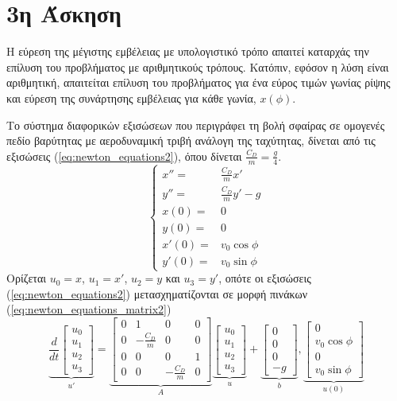 \documentclass[assignment4.tex]{subfiles}
\begin{document}
\section*{3η Άσκηση}
Η εύρεση της μέγιστης εμβέλειας με υπολογιστικό τρόπο απαιτεί καταρχάς την επίλυση του προβλήματος με αριθμητικούς τρόπους. Κατόπιν, εφόσον η λύση είναι αριθμητική, απαιτείται επίλυση του προβλήματος για ένα εύρος τιμών γωνίας ρίψης και εύρεση της συνάρτησης εμβέλειας για κάθε γωνία, $x(\phi)$. 

Το σύστημα διαφορικών εξισώσεων που περιγράφει τη βολή σφαίρας σε ομογενές πεδίο βαρύτητας με αεροδυναμική τριβή ανάλογη της ταχύτητας, δίνεται από τις εξισώσεις (\ref{eq:newton_equations2}), όπου δίνεται $\frac{C_D}{m}=\frac{g}{4}$.
\begin{equation}
\left\{
\begin{matrix}
x'' =& \frac{C_D}{m}x' \\
y'' =& \frac{C_D}{m}y'-g \\
x(0) =& 0 \\
y(0) =& 0 \\
x'(0) =& v_0 \cos \phi \\
y'(0) =& v_0 \sin \phi
\end{matrix}
\right.
\label{eq:newton_equations2}
\end{equation}
Ορίζεται $u_0=x$, $u_1=x'$, $u_2=y$ και $u_3=y'$, οπότε οι εξισώσεις (\ref{eq:newton_equations2}) μετασχηματίζονται σε μορφή πινάκων (\ref{eq:newton_equations_matrix2})
\begin{equation}
\underbrace{\frac{d}{dt}\left[
	\begin{matrix}
	u_0 \\
	u_1 \\
	u_2 \\
	u_3
	\end{matrix}
	\right]
}_{u'}
=
\underbrace{\left[
	\begin{matrix}
	0 & 1 & 0 & 0\\
	0 & -\frac{C_D}{m} & 0 & 0\\
	0 & 0 & 0 & 1\\
	0 & 0 & -\frac{C_D}{m} & 0
	\end{matrix}
	\right]
}_{A}
\underbrace{\left[
	\begin{matrix}
	u_0 \\
	u_1 \\
	u_2 \\
	u_3
	\end{matrix}
	\right]
}_{u}
+
\underbrace{\left[
	\begin{matrix}
	0 \\
	0 \\
	0 \\
	-g
	\end{matrix}
	\right]
}_{b}
,
\underbrace{\left[
	\begin{matrix}
	0 \\
	v_0\cos\phi \\
	0 \\
	v_0 \sin\phi
	\end{matrix}
	\right]
}_{u(0)}
\label{eq:newton_equations_matrix2}
\end{equation}
\end{document}
